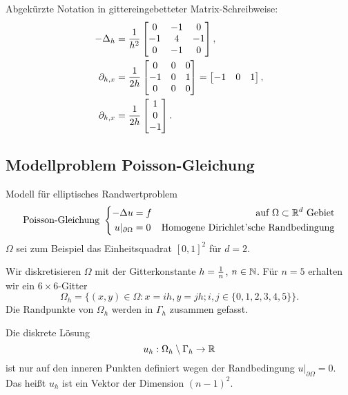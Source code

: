 Abgekürzte Notation in gittereingebetteter Matrix-Schreibweise:
\begin{align*}
  - \Delta_h
  &= \frac{1}{h^2}
    \begin{bmatrix}
      0 & -1 & 0 \\
      -1 & 4 & -1 \\
      0 & -1 & 0
    \end{bmatrix}, \\
  \partial_{h,x}
  &= \frac{1}{2 h}
    \begin{bmatrix}
      0 & 0 & 0 \\
      -1 & 0 & 1 \\
      0 & 0 & 0
    \end{bmatrix} =
              \begin{bmatrix}
                -1 & 0 & 1
              \end{bmatrix}, \\
  \partial_{h,x}
  &= \frac{1}{2 h}
    \begin{bmatrix}
      1 \\ 0 \\ -1
    \end{bmatrix}.
\end{align*}

\subsection{Modellproblem Poisson-Gleichung}
Modell für elliptisches Randwertproblem
\[ \text{Poisson-Gleichung } \left\{
    \begin{aligned}
      - \Delta u &= f & \text{auf } \Omega \subset \mathbb{R}^d \text{ Gebiet} \\
      u|_{\partial \Omega} &= 0 & \text{Homogene Dirichlet'sche Randbedingung}
    \end{aligned}
  \right. \]
$\Omega$ sei zum Beispiel das Einheitsquadrat $[0,1]^2$ für $d = 2$.

Wir diskretisieren $\Omega$ mit der Gitterkonstante $h = \frac{1}{n}$, $n \in \mathbb{N}$.
Für $n = 5$ erhalten wir ein $6 \times 6$-Gitter
\[ \Omega_h =
  \big\{ (x,y) \in \Omega : x = ih, y = jh; i,j \in \{0,1,2,3,4,5\} \big\}. \]
Die Randpunkte von $\Omega_h$ werden in $\Gamma_h$ zusammen gefasst.

Die diskrete Lösung
\[ u_h : \Omega_h \setminus \Gamma_h \to \mathbb{R} \]
ist nur auf den inneren Punkten definiert wegen der Randbedingung $u|_{\partial
  \Omega} = 0$. Das heißt $u_h$ ist ein Vektor der Dimension $(n-1)^2$.


